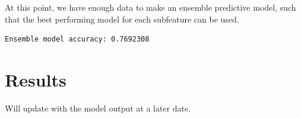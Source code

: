 \documentclass[
]{article}
\begin{document}
At this point, we have enough data to make an ensemble predictive model, such that the best performing model for each subfeature can be used.

\begin{verbatim}
Ensemble model accuracy: 0.7692308 
\end{verbatim}

\hypertarget{results}{%
\section{Results}\label{results}}

Will update with the model output at a later date.
\end{document}

